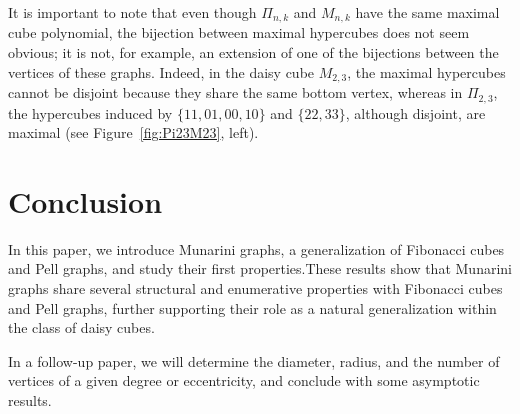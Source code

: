\documentclass[11pt]{article}
\begin{document}
It is important to note that even though $\Pi_{n,k}$ and $M_{n,k}$ have the same maximal cube polynomial, the bijection between maximal hypercubes does not seem obvious; it is not, for example, an extension of one of the bijections between the vertices of these graphs. Indeed, in the daisy cube $M_{2,3}$, the maximal hypercubes cannot be disjoint because they share the same bottom vertex, whereas in $\Pi_{2,3}$, the hypercubes induced by $\{11,01,00,10\}$ and $\{22,33\}$, although disjoint, are maximal (see Figure~\ref{fig:Pi23M23}, left).

\section{Conclusion}
\label{sec:asy}
In this paper, we introduce Munarini graphs, a generalization of Fibonacci cubes and Pell graphs, and study their first properties.These results show that Munarini graphs share several structural and enumerative properties with Fibonacci cubes and Pell graphs, further supporting their role as a natural generalization within the class of daisy cubes.

In a follow-up paper, we will determine the diameter, radius, and the number of vertices of a given degree or eccentricity, and conclude with some asymptotic results.
\end{document}
